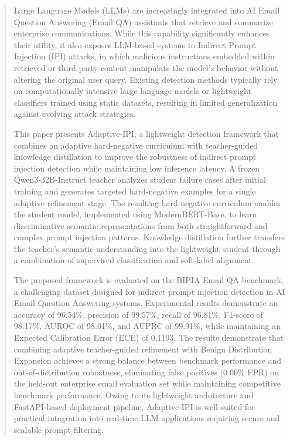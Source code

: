 \documentclass[conference]{IEEEtran}
\begin{document}
\begin{abstract}
Large Language Models (LLMs) are increasingly integrated into AI Email Question Answering (Email QA) assistants that retrieve and summarize enterprise communications. While this capability significantly enhances their utility, it also exposes LLM-based systems to Indirect Prompt Injection (IPI) attacks, in which malicious instructions embedded within retrieved or third-party content manipulate the model's behavior without altering the original user query. Existing detection methods typically rely on computationally intensive large language models or lightweight classifiers trained using static datasets, resulting in limited generalization against evolving attack strategies.

This paper presents Adaptive-IPI, a lightweight detection framework that combines an adaptive hard-negative curriculum with teacher-guided knowledge distillation to improve the robustness of indirect prompt injection detection while maintaining low inference latency. A frozen Qwen3-32B-Instruct teacher analyzes student failure cases after initial training and generates targeted hard-negative examples for a single adaptive refinement stage. The resulting hard-negative curriculum enables the student model, implemented using ModernBERT-Base, to learn discriminative semantic representations from both straightforward and complex prompt injection patterns. Knowledge distillation further transfers the teacher's semantic understanding into the lightweight student through a combination of supervised classification and soft-label alignment.

The proposed framework is evaluated on the BIPIA Email QA benchmark, a challenging dataset designed for indirect prompt injection detection in AI Email Question Answering systems. Experimental results demonstrate an accuracy of 96.54\%, precision of 99.57\%, recall of 96.81\%, F1-score of 98.17\%, AUROC of 98.01\%, and AUPRC of 99.91\%, while maintaining an Expected Calibration Error (ECE) of 0.1193. The results demonstrate that combining adaptive teacher-guided refinement with Benign Distribution Expansion achieves a strong balance between benchmark performance and out-of-distribution robustness, eliminating false positives (0.00\% FPR) on the held-out enterprise email evaluation set while maintaining competitive benchmark performance. Owing to its lightweight architecture and FastAPI-based deployment pipeline, Adaptive-IPI is well suited for practical integration into real-time LLM applications requiring secure and scalable prompt filtering.
\end{abstract}
\end{document}
